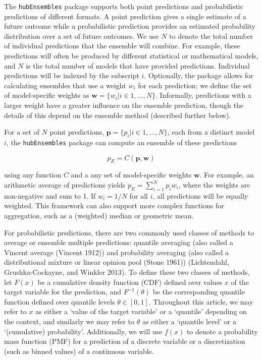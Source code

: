 \documentclass[
]{article}
\begin{document}
The \texttt{hubEnsembles} package supports both point predictions and
probabilistic predictions of different formats. A point prediction gives
a single estimate of a future outcome while a probabilistic prediction
provides an estimated probability distribution over a set of future
outcomes. We use \(N\) to denote the total number of individual
predictions that the ensemble will combine. For example, these
predictions will often be produced by different statistical or
mathematical models, and \(N\) is the total number of models that have
provided predictions. Individual predictions will be indexed by the
subscript \(i\). Optionally, the package allows for calculating
ensembles that use a weight \(w_i\) for each prediction; we define the
set of model-specific weights as
\(\pmb{w} = \{w_i | i \in 1, ..., N\}\). Informally, predictions with a
larger weight have a greater influence on the ensemble prediction,
though the details of this depend on the ensemble method (described
further below).

For a set of \(N\) point predictions,
\(\pmb{p} = \{p_i|i \in 1, ..., N\}\), each from a distinct model \(i\),
the \texttt{hubEnsembles} package can compute an ensemble of these
predictions

\[
p_E = C(\pmb{p}, \pmb{w}) 
\]

using any function \(C\) and a any set of model-specific weights
\(\pmb{w}\). For example, an arithmetic average of predictions yields
\(p_E = \sum_{i=1}^Np_iw_i\), where the weights are non-negative and sum
to 1. If \(w_i = 1/N\) for all \(i\), all predictions will be equally
weighted. This framework can also support more complex functions for
aggregation, such as a (weighted) median or geometric mean.

For probabilistic predictions, there are two commonly used classes of
methods to average or ensemble multiple predictions: quantile averaging
(also called a Vincent average (Vincent 1912)) and probability averaging
(also called a distributional mixture or linear opinion pool (Stone
1961)) (Lichtendahl, Grushka-Cockayne, and Winkler 2013). To define
these two classes of methods, let \(F(x)\) be a cumulative density
function (CDF) defined over values \(x\) of the target variable for the
prediction, and \(F^{-1}(\theta)\) be the corresponding quantile
function defined over quantile levels \(\theta \in [0, 1]\). Throughout
this article, we may refer to \(x\) as either a `value of the target
variable' or a `quantile' depending on the context, and similarly we may
refer to \(\theta\) as either a `quantile level' or a `(cumulative)
probability'. Additionally, we will use \(f(x)\) to denote a probability
mass function (PMF) for a prediction of a discrete variable or a
discretization (such as binned values) of a continuous variable.
\end{document}
